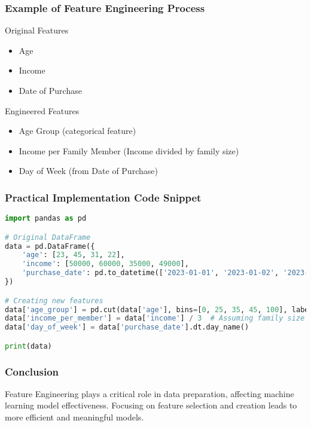\documentclass{beamer}
\begin{document}
\begin{frame}[fragile]
    \frametitle{Example of Feature Engineering Process}
    \begin{block}{Original Features}
        \begin{itemize}
            \item Age
            \item Income
            \item Date of Purchase
        \end{itemize}
    \end{block}
    
    \begin{block}{Engineered Features}
        \begin{itemize}
            \item Age Group (categorical feature)
            \item Income per Family Member (Income divided by family size)
            \item Day of Week (from Date of Purchase)
        \end{itemize}
    \end{block}
\end{frame}

\begin{frame}[fragile]
    \frametitle{Practical Implementation Code Snippet}
    \begin{lstlisting}[language=Python]
import pandas as pd

# Original DataFrame
data = pd.DataFrame({
    'age': [23, 45, 31, 22],
    'income': [50000, 60000, 35000, 49000],
    'purchase_date': pd.to_datetime(['2023-01-01', '2023-01-02', '2023-01-03', '2023-01-04'])
})

# Creating new features
data['age_group'] = pd.cut(data['age'], bins=[0, 25, 35, 45, 100], labels=['18-25', '26-35', '36-45', '46+'])
data['income_per_member'] = data['income'] / 3  # Assuming family size of 3
data['day_of_week'] = data['purchase_date'].dt.day_name()

print(data)
    \end{lstlisting}
\end{frame}

\begin{frame}[fragile]
    \frametitle{Conclusion}
    Feature Engineering plays a critical role in data preparation, affecting machine learning model effectiveness. Focusing on feature selection and creation leads to more efficient and meaningful models.
\end{frame}
\end{document}
